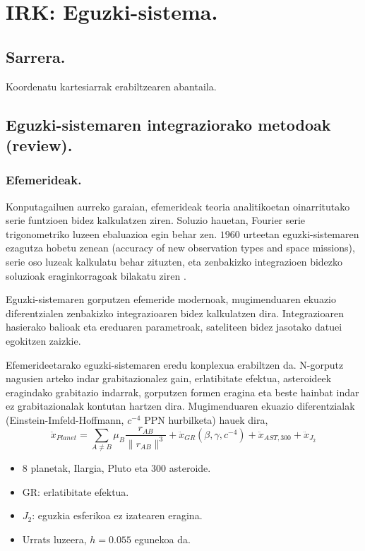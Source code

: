 \chapter{IRK: Eguzki-sistema.}

\section{Sarrera.}

Koordenatu kartesiarrak erabiltzearen abantaila.

\section{Eguzki-sistemaren integraziorako metodoak (review).}

\subsection{Efemerideak.}

Konputagailuen aurreko garaian, efemerideak teoria analitikoetan oinarritutako serie funtzioen bidez kalkulatzen ziren. Soluzio hauetan, Fourier serie trigonometriko luzeen ebaluazioa egin behar zen. $1960$ urteetan eguzki-sistemaren ezagutza hobetu zenean (accuracy of new observation types and space missions), serie oso luzeak kalkulatu behar zituzten, eta zenbakizko integrazioen bidezko soluzioak eraginkorragoak bilakatu ziren \cite{Kaplan2015}.   
   
Eguzki-sistemaren gorputzen efemeride modernoak, mugimenduaren ekuazio diferentzialen zenbakizko integrazioaren bidez kalkulatzen dira. Integrazioaren hasierako balioak eta ereduaren parametroak, sateliteen bidez jasotako datuei egokitzen zaizkie. 

Efemerideetarako eguzki-sistemaren eredu konplexua erabiltzen da. N-gorputz nagusien arteko indar grabitazionalez gain, erlatibitate efektua, asteroideek eragindako grabitazio indarrak, gorputzen formen eragina eta beste hainbat indar ez grabitazionalak kontutan hartzen dira. Mugimenduaren ekuazio diferentzialak  (Einstein-Imfeld-Hoffmann, $c^{-4}$ PPN hurbilketa) hauek dira,      
      \begin{equation*}
      \ddot{x}_{Planet}= \sum_{A \neq B} \mu_B \frac{r_{AB}}{\|r_{AB}\|^3}+\ddot{x}_{GR} (\beta,\gamma,c^{-4})+ \ddot{x}_{AST,300}+ \ddot{x}_{J_2}
      \end{equation*}
      
      \begin{itemize}
      \item $8$ planetak, Ilargia, Pluto eta 300 asteroide.
      \item GR: erlatibitate efektua.
      \item $J_2$: eguzkia esferikoa ez izatearen eragina. 
      \item Urrats luzeera, $h=0.055$ egunekoa da.
      \end{itemize}   

